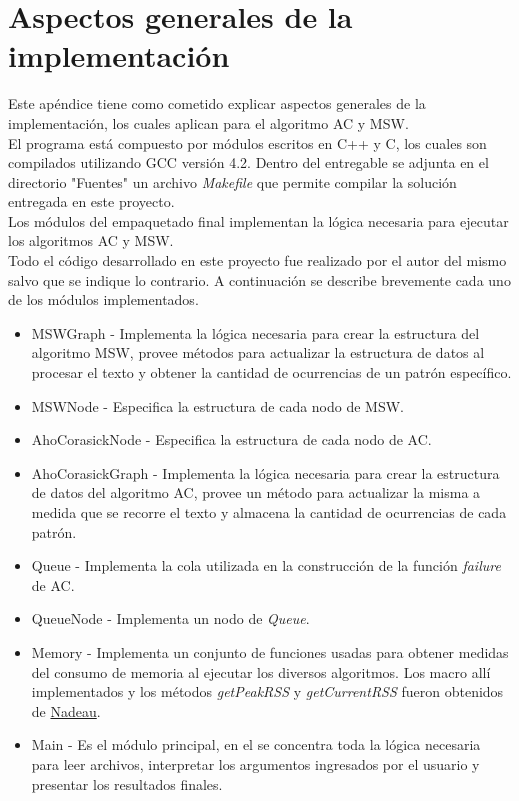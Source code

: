
\chapter{Aspectos generales de la implementación} %

\label{AppendixB} %


Este apéndice tiene como cometido explicar aspectos generales de la implementación, los cuales aplican para el algoritmo AC y MSW.\\
El programa está compuesto por módulos escritos en C++ y C, los cuales son compilados utilizando GCC versión 4.2. Dentro del entregable se adjunta en el directorio "Fuentes"  un archivo {\it Makefile} que permite compilar la solución entregada en este proyecto.\\
Los módulos del empaquetado final implementan la lógica necesaria para ejecutar los algoritmos AC y MSW.\\
Todo el código desarrollado en este proyecto fue realizado por el autor del mismo salvo que se indique lo contrario.
A continuación se describe brevemente cada uno de los módulos implementados.
\begin{itemize}
\item MSWGraph - Implementa la lógica necesaria para crear la estructura del algoritmo MSW, provee métodos para actualizar la estructura de datos al procesar el texto y obtener la cantidad de ocurrencias de un patrón específico.
\item MSWNode - Especifica la estructura de cada nodo de MSW. 
\item AhoCorasickNode - Especifica la estructura de cada nodo de AC. 
\item AhoCorasickGraph - Implementa la lógica necesaria para crear la estructura de datos del algoritmo AC, provee un método para actualizar la misma a medida que se recorre el texto y almacena la cantidad de ocurrencias de cada patrón.
\item Queue - Implementa la cola utilizada en la construcción de la función {\it failure} de AC.
\item QueueNode - Implementa un nodo de {\it Queue}.
\item Memory - Implementa un conjunto de funciones usadas para obtener medidas del consumo de memoria al ejecutar los diversos algoritmos. Los macro allí implementados y los métodos {\it getPeakRSS} y  {\it getCurrentRSS} fueron obtenidos de \href{http://goo.gl/4uZJKP}{Nadeau}.
\item Main - Es el módulo principal, en el se concentra toda la lógica necesaria para leer archivos, interpretar los argumentos ingresados por el usuario y presentar los resultados finales.
\end{itemize}
